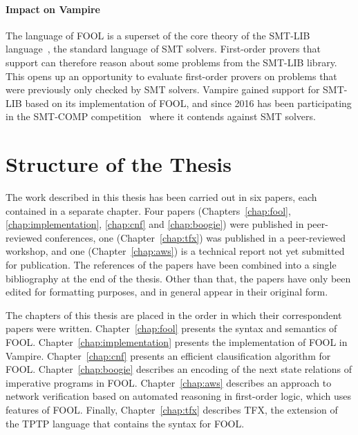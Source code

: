 \paragraph{Impact on Vampire}
The language of FOOL is a superset of the core theory of the SMT-LIB language~\cite{SMT-LIB}, the standard language of SMT solvers. First-order provers that support \folb{} can therefore reason about some problems from the SMT-LIB library. This opens up an opportunity to evaluate first-order provers on problems that were previously only checked by SMT solvers. Vampire gained support for SMT-LIB based on its implementation of FOOL, and since 2016 has been participating in the SMT-COMP competition~\cite{DBLP:conf/cav/BarrettMS05} where it contends against SMT solvers.

\section*{Structure of the Thesis}
\label{sect:intro:overview}

The work described in this thesis has been carried out in six papers, each contained in a separate chapter. Four papers (Chapters~\ref{chap:fool}, \ref{chap:implementation}, \ref{chap:cnf} and \ref{chap:boogie}) were published in peer-reviewed conferences, one (Chapter~\ref{chap:tfx}) was published in a peer-reviewed workshop, and one (Chapter~\ref{chap:aws}) is a technical report not yet submitted for publication. The references of the papers have been combined into a single bibliography at the end of the thesis. Other than that, the papers have only been edited for formatting purposes, and in general appear in their original form.

The chapters of this thesis are placed in the order in which their correspondent papers were written. Chapter~\ref{chap:fool} presents the syntax and semantics of FOOL. Chapter~\ref{chap:implementation} presents the implementation of FOOL in Vampire. Chapter~\ref{chap:cnf} presents an efficient clausification algorithm for FOOL. Chapter~\ref{chap:boogie} describes an encoding of the next state relations of imperative programs in FOOL. Chapter~\ref{chap:aws} describes an approach to network verification based on automated reasoning in first-order logic, which uses features of FOOL. Finally, Chapter~\ref{chap:tfx} describes TFX, the extension of the TPTP language that contains the syntax for FOOL.

